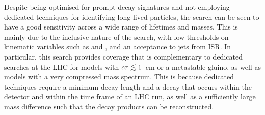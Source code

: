 Despite being optimised for prompt decay signatures and not employing dedicated 
techniques for identifying long-lived particles, the search can be seen to have 
a good sensitivity across a wide range of lifetimes and masses. This is mainly 
due to the inclusive nature of the search, with low thresholds on kinematic 
variables such as \scalht and \njet, and an acceptance to jets from ISR.
In particular, this search provides coverage that is complementary to dedicated 
searches at the LHC for models with $c\tau \lesssim 1$~cm or a metastable 
gluino, as well as models with a very compressed mass spectrum.
This is because dedicated techniques require a minimum decay length and a decay 
that occurs within the detector and within the time frame of an LHC run, as 
well as a sufficiently large mass difference such that the decay products can 
be reconstructed.

